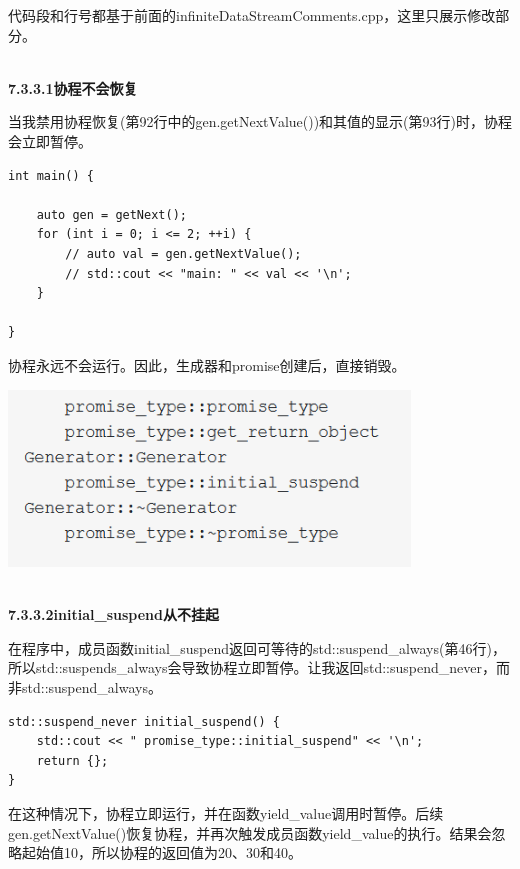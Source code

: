 代码段和行号都基于前面的infiniteDataStreamComments.cpp，这里只展示修改部分。

\hspace*{\fill} \\ %
\noindent
\textbf{7.3.3.1\hspace{0.2cm}协程不会恢复}

当我禁用协程恢复(第92行中的gen.getNextValue())和其值的显示(第93行)时，协程会立即暂停。

\begin{lstlisting}[style=styleCXX]
int main() {
	
	auto gen = getNext();
	for (int i = 0; i <= 2; ++i) {
		// auto val = gen.getNextValue();
		// std::cout << "main: " << val << '\n';
	}

}
\end{lstlisting}

协程永远不会运行。因此，生成器和promise创建后，直接销毁。

\begin{center}
\includegraphics[width=0.8\textwidth]{content/3/chapter7/images/15.png}\\
\end{center}

\hspace*{\fill} \\ %
\noindent
\textbf{7.3.3.2\hspace{0.2cm}initial\_suspend从不挂起}

在程序中，成员函数initial\_suspend返回可等待的std::suspend\_always(第46行)，所以std::suspends\_always会导致协程立即暂停。让我返回std::suspend\_never，而非std::suspend\_always。

\begin{lstlisting}[style=styleCXX]
std::suspend_never initial_suspend() {
	std::cout << " promise_type::initial_suspend" << '\n';
	return {};
}
\end{lstlisting}

在这种情况下，协程立即运行，并在函数yield\_value调用时暂停。后续gen.getNextValue()恢复协程，并再次触发成员函数yield\_value的执行。结果会忽略起始值10，所以协程的返回值为20、30和40。

